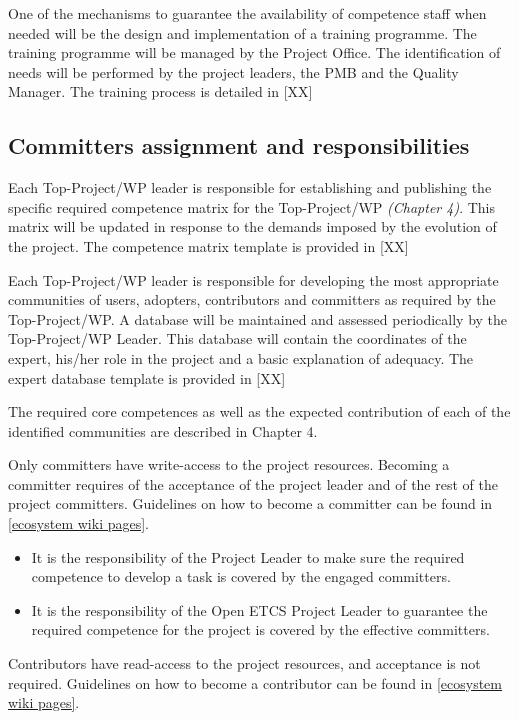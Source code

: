 \documentclass{template/openetcs_article}
\begin{document}
One of the mechanisms to guarantee the availability of competence staff when needed will be the design and implementation of a training programme. The training programme will be managed by the Project Office. The identification of needs will be performed by the project leaders, the PMB and the Quality Manager. 
The training process is detailed in [XX]


\subsection{Committers assignment and responsibilities}

Each Top-Project/WP leader is responsible for establishing and publishing the specific required competence matrix for the Top-Project/WP \textit{(Chapter 4)}. This matrix will be updated in response to the demands imposed by the evolution of the project. The competence matrix template \citep{Competence}is provided in [XX]

Each Top-Project/WP leader is responsible for developing the most appropriate communities of users, adopters, contributors and committers as required by the Top-Project/WP. A database will be maintained and assessed periodically by the Top-Project/WP Leader. This database will contain the coordinates of the expert, his/her role in the project and a basic explanation of adequacy. The expert database template is provided in [XX]

The required core competences as well as the expected contribution of each of the identified communities are described in Chapter 4.

Only committers have write-access to the project resources. Becoming a committer requires of the acceptance of the project leader and of the rest of the project committers. Guidelines on how to become a committer can be found in \href{https://github.com/openETCS/ecosystem/wiki/_pages}{[ecosystem wiki pages]}.

\begin{itemize}
\item It is the responsibility of the Project Leader to make sure the required competence to develop a task is covered by the engaged committers.
\item It is the responsibility of the Open ETCS Project Leader to guarantee the required competence for the project is covered by the effective committers.
\end{itemize}

Contributors have read-access to the project resources, and acceptance is not required. Guidelines on how to become a contributor can be found in \href{https://github.com/openETCS/ecosystem/wiki/_pages}{[ecosystem wiki pages]}.
\end{document}
